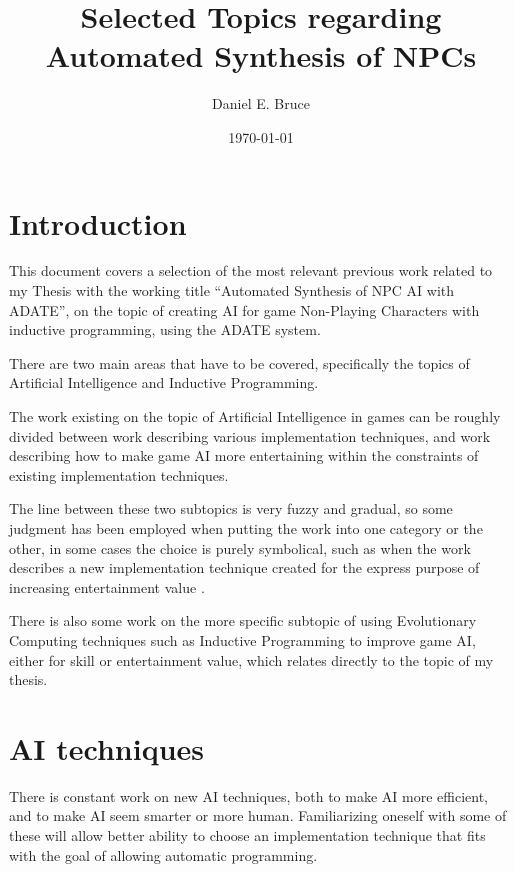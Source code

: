 \documentclass[]{report}
\begin{document}
\title{Selected Topics regarding Automated Synthesis of NPCs}
\author{Daniel E. Bruce}
\date{\today}
\maketitle

\tableofcontents


\chapter{Introduction}
\label{cha:introduction}

This document covers a selection of the most relevant previous work related to
my Thesis with the working title ``Automated Synthesis of NPC AI with ADATE'',
on the topic of creating AI for game Non-Playing Characters with inductive
programming, using the ADATE system.

There are two main areas that have to be covered, specifically the topics of
Artificial Intelligence and Inductive Programming.

The work existing on the topic of Artificial Intelligence in games can be
roughly divided between work describing various implementation techniques, and
work describing how to make game AI more entertaining within the constraints of
existing implementation techniques.

The line between these two subtopics is very fuzzy and gradual, so some judgment
has been employed when putting the work into one category or the other, in some
cases the choice is purely symbolical, such as when the work describes a new
implementation technique created for the express purpose of increasing
entertainment value \citep[for example][]{khoo2002efficient}.

There is also some work on the more specific subtopic of using Evolutionary
Computing techniques such as Inductive Programming to improve game AI, either
for skill or entertainment value, which relates directly to the topic of my
thesis.

\chapter{AI techniques}
\label{cha:ai-techniques}

There is constant work on new AI techniques, both to make AI more efficient, and
to make AI seem smarter or more human. Familiarizing oneself with some of these
will allow better ability to choose an implementation technique that fits with
the goal of allowing automatic programming.
\end{document}
